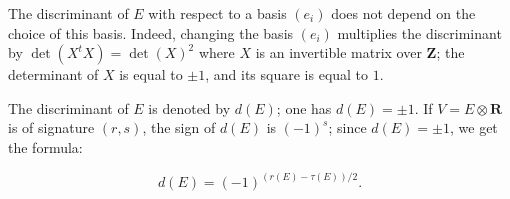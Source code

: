 The discriminant of $E$ with respect to a basis $(e_i)$ does not depend on the choice of this basis. Indeed, changing the basis $(e_i)$ multiplies the discriminant by $\det(X^t X) = \det(X)^2$ where $X$ is an invertible matrix over $\mathbf{Z}$; the determinant of $X$ is equal to $\pm 1$, and its square is equal to $1$.

The discriminant of $E$ is denoted by $d(E)$; one has $d(E) = \pm 1$. If $V = E \otimes \mathbf{R}$ is of signature $(r, s)$, the sign of $d(E)$ is $(-1)^s$; since $d(E) = \pm 1$, we get the formula:

$$d(E) = (-1)^{(r(E) - \tau(E))/2}.$$
